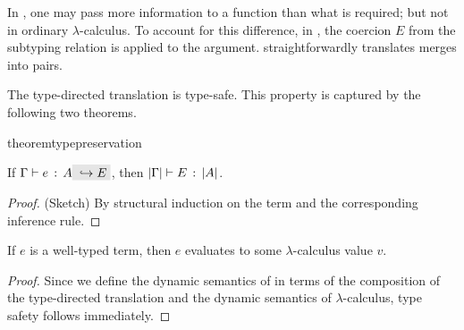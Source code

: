

In \name, one may pass more information to a function than what is required; but
not in ordinary $\lambda$-calculus. To account for this difference, in , the
coercion $E$ from the subtyping relation is applied to the argument.
 straightforwardly translates merges into pairs.

The type-directed translation is type-safe. This property is captured
by the following two theorems.

\begin{restatable}{theorem}{typepreservation}
  \label{theorem:type-preservation}

  If $ \jtype \Gamma e A \yields E $,
  then $ \lvert \Gamma \rvert \vdash E \ \!:\! \ \lvert A \rvert $.
\end{restatable}

\begin{proof}
  (Sketch) By structural induction on the term and the corresponding
  inference rule.
\end{proof}

\begin{theorem}
  If $e$ is a well-typed \name term, then $e$ evaluates to some $\lambda$-calculus
  value $v$.
\end{theorem}

\begin{proof}
  Since we define the dynamic semantics of \name in terms of the composition of
  the type-directed translation and the dynamic semantics of $\lambda$-calculus, type safety follows immediately.
\end{proof}

